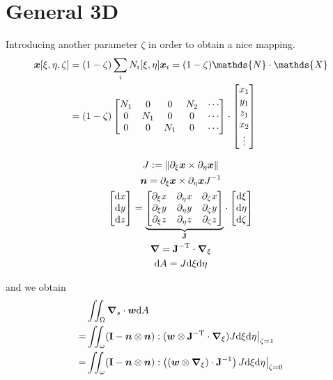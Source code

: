 \documentclass[a4paper,11pt]{article}
\renewcommand{\to}[1]{\text{\boldmath $#1$}} %
\newcommand{\ts}[1]{\text{\boldmath $\mathrm{#1}$}} %
\newcommand{\uv}[1]{\mathds{#1}}
\newcommand{\um}[1]{\mathds{#1}}
\newcommand{\intd}[1]{\mathrm{d}#1}
\newcommand{\pderiv}[2]{\partial_{#2} #1}
\newcommand{\norm}[1]{\left\lVert{#1}\right\rVert}
\newcommand{\T}{\mathrm{T}}
\newcommand{\defeq}{:=}
\begin{document}
\section{General 3D}

Introducing another parameter $\zeta$ in order to obtain a nice mapping.
\begin{align}
 \to x[\xi,\eta,\zeta] &= (1-\zeta)\sum_i N_i[\xi,\eta]\to x_i = (1-\zeta) \um N \cdot \uv X\\
  &= (1-\zeta) \begin{bmatrix}N_1 & 0 & 0 & N_2 & \cdots\\0&N_1&0&0&\cdots\\0&0&N_1&0&\cdots\end{bmatrix}\cdot\begin{bmatrix}x_1\\y_1\\z_1\\x_2\\\vdots\end{bmatrix}
\end{align}

\begin{gather}
 J \defeq \norm{\pderiv{\to x}{\xi} \times  \pderiv{\to x}{\eta}}\\
 \to n = \pderiv{\to x}{\xi} \times \pderiv{\to x}{\eta} J^{-1}\\
 \begin{bmatrix}\intd x\\ \intd y\\ \intd z\end{bmatrix} =
  \underbrace{\begin{bmatrix}\pderiv{x}{\xi} & \pderiv{x}{\eta} & \pderiv{x}{\zeta}\\
	  \pderiv{y}{\xi} & \pderiv{y}{\eta} & \pderiv{y}{\zeta}\\
	  \pderiv{z}{\xi} & \pderiv{z}{\eta} & \pderiv{z}{\zeta} \end{bmatrix}}_{\ts J}
  \cdot \begin{bmatrix}\intd \xi \\ \intd \eta \\ \intd \zeta\end{bmatrix}\\
 \to\nabla = \ts J^{-\T}\cdot\to\nabla_\xi\\
 \intd A = J \intd \xi \intd \eta 
\end{gather}

and we obtain
\begin{align}
 &\iint_\Omega\to \nabla_s\cdot\to w\intd A\\
=&\iint_\omega(\ts I-\to n\otimes\to n):(\to w\otimes \ts J^{-\T}\cdot\to\nabla_\xi)J\intd\xi\intd\eta\big|_{\zeta=1}\\
=&\iint_\omega(\ts I-\to n\otimes\to n):\left((\to w\otimes\to\nabla_\xi) \cdot\ts J^{-1}\right)J\intd\xi\intd\eta\big|_{\zeta=0}
\end{align}
\end{document}
